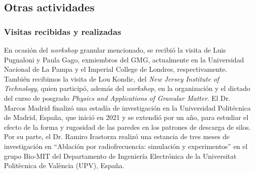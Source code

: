 \documentclass[a4paper,11pt,twoside,final,titlepage,onecolumn,openright]{report}
\begin{document}
\subsection{Otras actividades}

\subsubsection{Visitas recibidas y realizadas}

En ocasión del \textit{workshop} granular mencionado, se recibió la visita de Luis Pugnaloni y Paula Gago, exmiembros del GMG, actualmente en la Universidad Nacional de La Pampa y el Imperial College de Londres, respectivamente. También recibimos la visita de Lou Kondic, del \textit{New Jersey Institute of Technology}, quien participó, además del \textit{workshop}, en la organización y el dictado del curso de posgrado \textit{Physics and Applications of Granular Matter}. El Dr. Marcos Madrid finalizó una estadía de investigación en la Universidad Politécnica de Madrid, España, que inició en 2021 y se extendió por un año, para estudiar el efecto de la forma y rugosidad de las paredes en los patrones de descarga de silos. Por su parte, el Dr. Ramiro Irastorza realizó una estancia de tres meses de investigación en ``Ablación por radiofrecuencia: simulación y experimentos'' en el grupo Bio-MIT del Departamento de Ingeniería Electrónica de la Universitat Politècnica de València (UPV), España.

% 
% 
% 
%  
\end{document}
